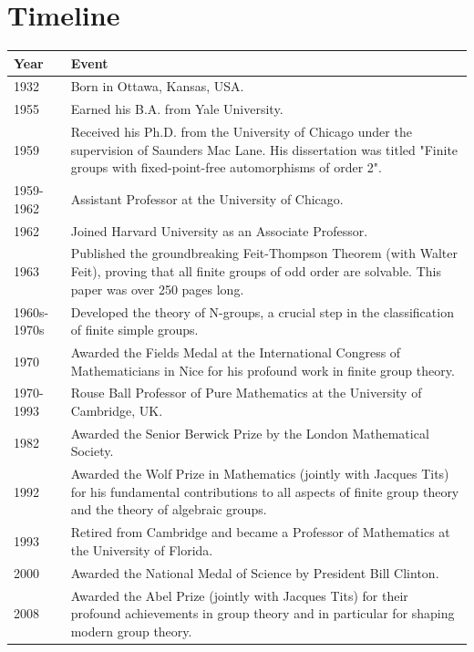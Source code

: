 \section*{Timeline}
\begin{tabularx}{\linewidth}{|p{1.5cm}|>{\raggedright\arraybackslash}X|}
\hline
\textbf{Year} & \textbf{Event} \\ \hline
1932 & Born in Ottawa, Kansas, USA. \\ \hline
1955 & Earned his B.A. from Yale University. \\ \hline
1959 & Received his Ph.D. from the University of Chicago under the supervision of Saunders Mac Lane. His dissertation was titled "Finite groups with fixed-point-free automorphisms of order 2". \\ \hline
1959-1962 & Assistant Professor at the University of Chicago. \\ \hline
1962 & Joined Harvard University as an Associate Professor. \\ \hline
1963 & Published the groundbreaking Feit-Thompson Theorem (with Walter Feit), proving that all finite groups of odd order are solvable. This paper was over 250 pages long. \\ \hline
1960s-1970s & Developed the theory of N-groups, a crucial step in the classification of finite simple groups. \\ \hline
1970 & Awarded the Fields Medal at the International Congress of Mathematicians in Nice for his profound work in finite group theory. \\ \hline
1970-1993 & Rouse Ball Professor of Pure Mathematics at the University of Cambridge, UK. \\ \hline
1982 & Awarded the Senior Berwick Prize by the London Mathematical Society. \\ \hline
1992 & Awarded the Wolf Prize in Mathematics (jointly with Jacques Tits) for his fundamental contributions to all aspects of finite group theory and the theory of algebraic groups. \\ \hline
1993 & Retired from Cambridge and became a Professor of Mathematics at the University of Florida. \\ \hline
2000 & Awarded the National Medal of Science by President Bill Clinton. \\ \hline
2008 & Awarded the Abel Prize (jointly with Jacques Tits) for their profound achievements in group theory and in particular for shaping modern group theory. \\ \hline
\end{tabularx}

